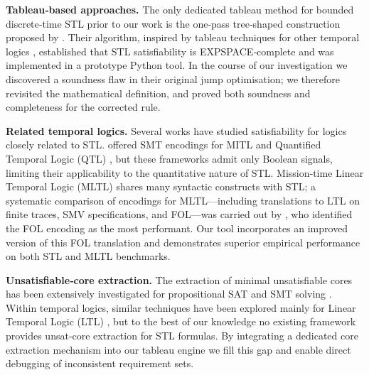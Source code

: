 \documentclass{easychair}
\begin{document}
\noindent \textbf{Tableau‑based approaches.}
The only dedicated tableau method for bounded discrete‑time STL prior to our work is the one‑pass tree‑shaped construction proposed by \citet{MelaniBC25}.  Their algorithm, inspired by tableau techniques for other temporal logics \citep{Reynolds16,GeattiGMR21}, established that STL satisfiability is \textsc{EXPSPACE}‑complete and was implemented in a prototype Python tool.  In the course of our investigation we discovered a soundness flaw in their original jump optimisation; we therefore revisited the mathematical definition, and proved both soundness and completeness for the corrected rule.

\noindent \textbf{Related temporal logics.}
Several works have studied satisfiability for logics closely related to STL.  \citet{BersaniRP15,BersaniRP16} offered SMT encodings for MITL and Quantified Temporal Logic (QTL) \citep{HirshfeldR05}, but these frameworks admit only Boolean signals, limiting their applicability to the quantitative nature of STL.  Mission‑time Linear Temporal Logic (MLTL) \citep{ReinbacherRS14} shares many syntactic constructs with STL; a systematic comparison of encodings for MLTL—including translations to LTL on finite traces, SMV specifications, and FOL—was carried out by \citet{LiVR22}, who identified the FOL encoding as the most performant.  Our tool incorporates an improved version of this FOL translation and demonstrates superior empirical performance on both STL and MLTL benchmarks.

\noindent \textbf{Unsatisfiable‑core extraction.}
The extraction of minimal unsatisfiable cores has been extensively investigated for propositional SAT and SMT solving \citep{CimattiGS07}.  Within temporal logics, similar techniques have been explored mainly for Linear Temporal Logic (LTL) \citep{Schuppan16,GeattiGMV24}, but to the best of our knowledge no existing framework provides unsat‑core extraction for STL formulas.  By integrating a dedicated core extraction mechanism into our tableau engine we fill this gap and enable direct debugging of inconsistent requirement sets.

\end{document}

